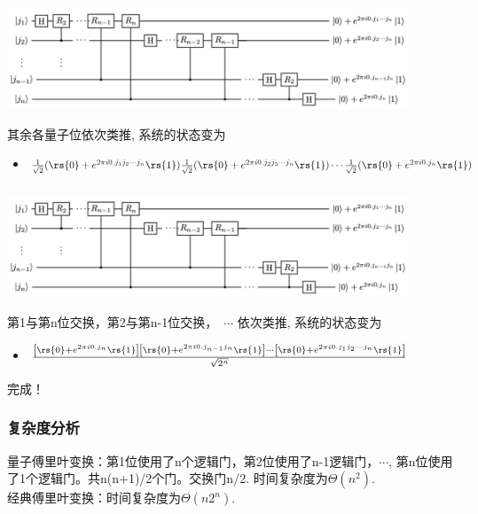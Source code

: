 \begin{frame}
    \frametitle{}
    \begin{center}
        \begin{center}
            \includegraphics[width=0.9\textwidth]{figs/37.png}
        \end{center}
    \end{center}  
    {\Bullet} 其余各量子位依次类推, 系统的状态变为 \\ \vspace{0.3em}
    \begin{itemize}
        \item  $\frac{1}{\sqrt{2}}(\rs{0}+e^{2\pi i 0.j_1 j_2\cdots j_n }\rs{1}) \frac{1}{\sqrt{2}}(\rs{0}+e^{2\pi i 0.j_2j_3\cdots j_{n}}\rs{1})\cdots \frac{1}{\sqrt{2}}(\rs{0}+e^{2\pi i 0.j_{n}}\rs{1})$
    \end{itemize}
\end{frame}

\begin{frame}
    \frametitle{}
    \begin{center}
        \begin{center}
            \includegraphics[width=0.9\textwidth]{figs/37.png}
        \end{center}
    \end{center}  
    {\Bullet} 第1与第n位交换，第2与第n-1位交换， $\cdots$ 依次类推, 系统的状态变为 \\ \vspace{0.3em}
    \begin{itemize}
        \item  $\frac{\left[\rs{0} + e^{2\pi i 0. j_n} \rs{1} \right] \left[\rs{0} + e^{2\pi i 0. j_{n-1} j_n} \rs{1} \right] \cdots \left[\rs{0} + e^{2\pi i 0. j_1 j_2 \cdots j_n} \rs{1} \right] } {\sqrt{2^n}}$
    \end{itemize}
    完成！
\end{frame}

\begin{frame}
    \frametitle{复杂度分析}
    {\Bullet} 量子傅里叶变换：第1位使用了n个逻辑门，第2位使用了n-1逻辑门，$\cdots$, 第n位使用了1个逻辑门。共n(n+1)/2个门。交换门n/2. 时间复杂度为$\Theta(n^2)$.\\
    {\Bullet} 经典傅里叶变换：时间复杂度为$\Theta(n 2^n)$.\\
\end{frame}